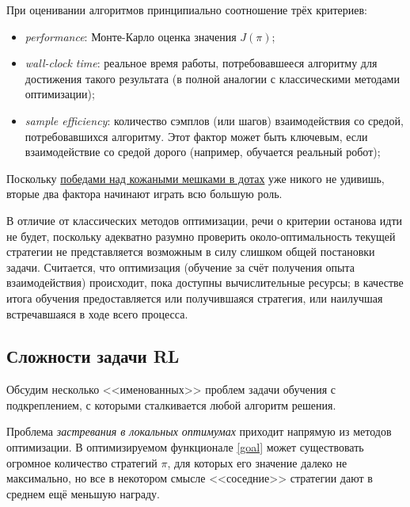 При оценивании алгоритмов принципиально соотношение трёх критериев:
\begin{itemize}
    \item \emph{performance}: Монте-Карло оценка значения $J(\pi)$;
    \item \emph{wall-clock time}: реальное время работы, потребовавшееся алгоритму для достижения такого результата (в полной аналогии с классическими методами оптимизации);
    \item \emph{sample efficiency}: количество сэмплов (или шагов) взаимодействия со средой, потребовавшихся алгоритму. Этот фактор может быть ключевым, если взаимодействие со средой дорого (например, обучается реальный робот); 
\end{itemize}

\begin{remark}Поскольку \href{https://openai.com/projects/five/}{победами над кожаными мешками в дотах} уже никого не удивишь, вторые два фактора начинают играть всю большую роль.
\end{remark}

В отличие от классических методов оптимизации, речи о критерии останова идти не будет, поскольку адекватно разумно проверить около-оптимальность текущей стратегии не представляется возможным в силу слишком общей постановки задачи. Считается, что оптимизация (обучение за счёт получения опыта взаимодействия) происходит, пока доступны вычислительные ресурсы; в качестве итога обучения предоставляется или получившаяся стратегия, или наилучшая встречавшаяся в ходе всего процесса.

\subsection{Сложности задачи RL}

Обсудим несколько <<именованных>> проблем задачи обучения с подкреплением, с которыми сталкивается любой алгоритм решения.

Проблема \emph{застревания в локальных оптимумах} приходит напрямую из методов оптимизации. В оптимизируемом функционале \eqref{goal} может существовать огромное количество стратегий $\pi$, для которых его значение далеко не максимально, но все в некотором смысле <<соседние>> стратегии дают в среднем ещё меньшую награду.

